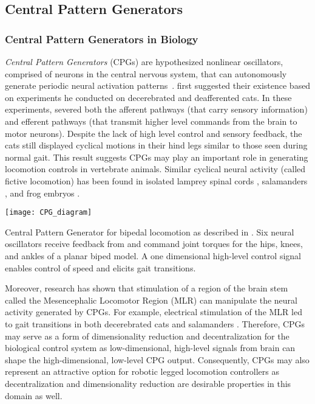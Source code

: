 \subsection{Central Pattern Generators}\label{sec:back_CPG}
\subsubsection{Central Pattern Generators in Biology}
\emph{Central Pattern Generators} (CPGs) are hypothesized nonlinear
oscillators, comprised of neurons in the central nervous system, that can
autonomously generate periodic neural activation
patterns~\citep{ijspeert2008central}.  \citet{brown1911intrinsic} first
suggested their existence based on experiments he conducted on decerebrated and
deafferented cats. In these experiments, \citeauthor{brown1911intrinsic} severed
both the afferent pathways (that carry sensory information) and efferent
pathways (that transmit higher level commands from the brain to motor neurons).
Despite the lack of high level control and sensory feedback, the cats still
displayed cyclical motions in their hind legs similar to those seen during
normal gait. This result suggests CPGs may play an important role in generating
locomotion controls in vertebrate animals. Similar cyclical neural activity
(called fictive locomotion) has been found in isolated lamprey spinal cords
\citep{cohen1980neuronal}, salamanders \citep{delvolve1999fictive}, and frog
embryos \citep{soffe1982tonic}. 

\begin{marginfigure}
    \centering
    \texttt{[image: CPG\_diagram]}
    \caption{Central Pattern Generator for bipedal locomotion as described in
    \citet{taga1991self}. Six neural oscillators receive feedback from and
    command joint torques for the hips, knees, and ankles of a planar biped
    model. A one dimensional high-level control signal enables control of speed
    and elicits gait transitions.}
    \label{fig:cpg_diagram}
\end{marginfigure}
Moreover, research has shown that stimulation of a region of the brain stem
called the Mesencephalic Locomotor Region (MLR) can manipulate the neural
activity generated by CPGs. For example, electrical stimulation of the MLR led
to gait transitions in both decerebrated cats \citep{shik1966control} and
salamanders \citep{cabelguen2003bimodal}.  Therefore, CPGs may serve as a form
of dimensionality reduction and decentralization for the biological control
system as low-dimensional, high-level signals from brain can shape the
high-dimensional, low-level CPG output. Consequently, CPGs may also represent
an attractive option for robotic legged locomotion controllers as
decentralization and dimensionality reduction are desirable properties in this
domain as well.

